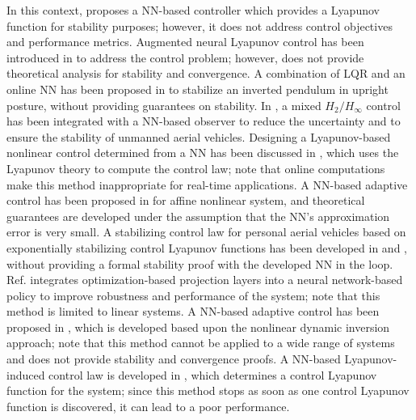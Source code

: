 \documentclass[1p,times]{elsarticle}
\begin{document}
In this context, \cite{dai2021lyapunov} proposes a NN-based controller which provides a Lyapunov function for stability purposes; however, it does not address control objectives and performance metrics. {{{\color{blue}}}Augmented neural Lyapunov control has been introduced in \cite{grande2023augmentedNLC} to address the control problem; however, \cite{grande2023augmentedNLC} does not provide theoretical analysis for stability and convergence.} A combination of LQR and an online NN has been proposed in \cite{nghi2021lqr} to stabilize an inverted pendulum in upright posture, without providing guarantees on stability. {{{\color{blue}}}In \cite{alsaade2023HHinf}, a mixed $H_2/H_{\infty}$ control has been integrated with a NN-based observer to reduce the uncertainty and to ensure the stability of unmanned aerial vehicles.} Designing a Lyapunov-based nonlinear control determined from a NN has been discussed in \cite{rego2022lyapunov}, which uses the Lyapunov theory to compute the control law; note that online computations make this method inappropriate for real-time applications. {{\color{blue}}A NN-based adaptive control has been proposed in \cite{Esfandiari2021} for affine nonlinear system, and theoretical guarantees are developed under the assumption that the NN's approximation error is very small.} A stabilizing control law for personal aerial vehicles based on exponentially stabilizing control Lyapunov functions has been developed in \cite{jang2022dnlc} and \cite{jang2023uamdyncon}, without providing a formal stability proof with the developed NN in the loop. Ref. \cite{donti2020enforcing} integrates optimization-based projection layers into a neural network-based policy to improve robustness and performance of the system; note that this method is limited to linear systems. A NN-based adaptive control has been proposed in \cite{autenrieb2019development}, which is developed based upon the nonlinear dynamic inversion approach; note that this  method cannot be applied to a wide range of systems and does not provide stability and convergence proofs. A NN-based Lyapunov-induced control law is developed in \cite{ravanbakhsh2019learner}, which determines a control Lyapunov function for the system; since this method stops as soon as one control Lyapunov function is discovered, it can lead to a poor performance.


\end{document}
